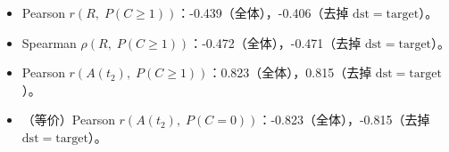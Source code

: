 \begin{itemize}
  \item Pearson $r(R,\;P(C\ge1))$：-0.439（全体），-0.406（去掉 $\mathrm{dst}=\mathrm{target}$）。
  \item Spearman $\rho(R,\;P(C\ge1))$：-0.472（全体），-0.471（去掉 $\mathrm{dst}=\mathrm{target}$）。
  \item Pearson $r(A(t_2),\;P(C\ge1))$：0.823（全体），0.815（去掉 $\mathrm{dst}=\mathrm{target}$）。
  \item （等价）Pearson $r(A(t_2),\;P(C=0))$：-0.823（全体），-0.815（去掉 $\mathrm{dst}=\mathrm{target}$）。
\end{itemize}
